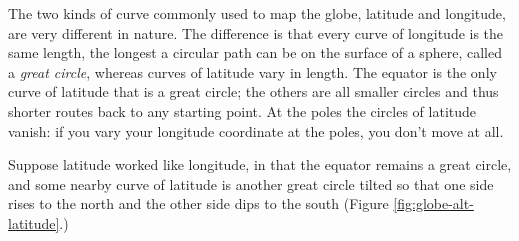 The two kinds of curve commonly used to map the globe, latitude and longitude, are very different in nature. The difference is that every curve of longitude is the same length, the longest a circular path can be on the surface of a sphere, called a \textit{great circle}, whereas curves of latitude vary in length. The equator is the only curve of latitude that is a great circle; the others are all smaller circles and thus shorter routes back to any starting point. At the poles the circles of latitude vanish: if you vary your longitude coordinate at the poles, you don't move at all.

Suppose latitude worked like longitude, in that the equator remains a great circle, and some nearby curve of latitude is another great circle tilted so that one side rises to the north and the other side dips to the south (Figure \ref{fig:globe-alt-latitude}.)

